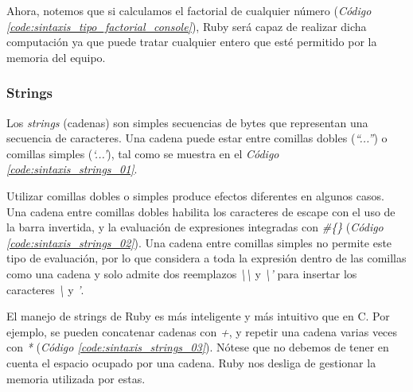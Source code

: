 \documentclass{article}
\newcommand{\refcode}[1]{\textit{Código \ref{#1}}}
\begin{document}
 
\bigskip

Ahora, notemos que si calculamos el factorial de cualquier número (\refcode{code:sintaxis_tipo_factorial_console}), Ruby será capaz de realizar dicha computación ya que puede tratar cualquier entero que esté permitido por la memoria del equipo.

 
\bigskip



\subsubsection{Strings}
	
	Los \textit{strings} (cadenas) son simples secuencias de bytes que representan una secuencia de caracteres. Una cadena puede estar entre comillas dobles (\textit{``...''}) o comillas simples (\textit{`...'}), tal como se muestra en el \refcode{code:sintaxis_strings_01}. 


\bigskip

	Utilizar comillas dobles o simples produce efectos diferentes en algunos casos. Una cadena entre comillas dobles habilita los caracteres de escape con el uso de la barra invertida, y la evaluación de expresiones integradas con \textit{\#\{\}} (\refcode{code:sintaxis_strings_02}). Una cadena entre comillas simples no permite este tipo de evaluación, por lo que considera a toda la expresión dentro de las comillas como una cadena y solo admite dos reemplazos \textit{\textbackslash\textbackslash} y \textit{\textbackslash'} para insertar los caracteres \textit{\textbackslash} y \textit{'}.

 
\bigskip

	El manejo de strings de Ruby es más inteligente y más intuitivo que en C. Por ejemplo, se pueden concatenar cadenas con \textit{+}, y repetir una cadena varias veces con \textit{*} (\refcode{code:sintaxis_strings_03}). Nótese que no debemos de tener en cuenta el espacio ocupado por una cadena. Ruby nos desliga de gestionar la memoria utilizada por estas.
\end{document}
